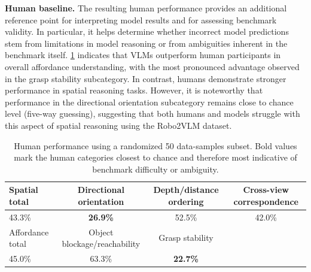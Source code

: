 \textbf{Human baseline.}
The resulting human performance provides an additional reference point for interpreting model results and for assessing benchmark validity. In particular, it helps determine whether incorrect model predictions stem from limitations in model reasoning or from ambiguities inherent in the benchmark itself. \cref{tab:human} indicates that VLMs outperform human participants in overall affordance understanding, with the most pronounced advantage observed in the grasp stability subcategory. In contrast, humans demonstrate stronger performance in spatial reasoning tasks. However, it is noteworthy that performance in the directional orientation subcategory remains close to chance level (five-way guessing), suggesting that both humans and models struggle with this aspect of spatial reasoning using the Robo2VLM dataset.

\begin{table}[t]
  \centering
  \small
  \setlength{\tabcolsep}{4pt}
  \begin{tabular}{@{}lccc@{}}
    \toprule
    Spatial total & Directional orientation & Depth/distance ordering & Cross-view correspondence \\
    \midrule
    43.3\% & \textbf{26.9\%} & 52.5\% & 42.0\% \\
    \midrule
    Affordance total & Object blockage/reachability & Grasp stability & \\
    \midrule
    45.0\% & 63.3\% & \textbf{22.7\%} & \\
    \bottomrule
  \end{tabular}
  \caption{Human performance using a randomized 50 data-samples subset. Bold values mark the human categories closest to chance and therefore most indicative of benchmark difficulty or ambiguity.}
  \label{tab:human}
\end{table}
